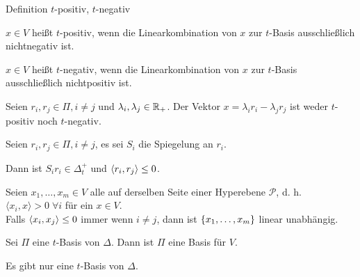 \documentclass{beamer}
\begin{document}
\begin{frame}{Definition \(t\)-positiv, \( t \)-negativ}
    \begin{defi}
        \( x \in V \) heißt \(t\)-positiv, wenn 
        die Linearkombination von \(x\) zur 
        \(t\)-Basis ausschließlich nichtnegativ ist.

        \( x \in V \) heißt \(t\)-negativ, wenn 
        die Linearkombination von \(x\) zur 
        \(t\)-Basis ausschließlich nichtpositiv ist.
    \end{defi}
    \pause
    \begin{satz} %
        Seien \( r_i, r_j \in \Pi, i \neq j \) und 
        \( \lambda_i, \lambda_j \in \mathbb{R}_+ \). 
        Der Vektor \( x = \lambda_i r_i - \lambda_j r_j \) 
        ist weder \( t \)-positiv noch \( t \)-negativ.
    \end{satz}
\end{frame}

\begin{frame}
    \begin{satz} %
        
        Seien \( r_i, r_j \in \Pi, i \neq j \), es 
        sei \( S_i \) die Spiegelung an \( r_i \). 

        Dann ist \( S_i r_i \in \Delta_t^+ \) und 
        \( \langle r_i, r_j \rangle \leq 0 \).
    \end{satz}\pause

    \begin{satz} %
        Seien \( x_1, \ldots, x_m \in V \) alle auf derselben 
        Seite einer Hyperebene \( \mathscr{P} \), 
        d. h. \( \langle x_i, x \rangle > 0 \;\forall i \) für 
        ein \( x\in V \). \\
        Falls \( \langle x_i, x_j \rangle \leq 0 \) immer wenn 
        \( i \neq j \), dann ist \( \{x_1, \ldots, x_m\} \) 
        linear unabhängig.
    \end{satz}
\end{frame}

\begin{frame}
    \begin{satz} %
        Sei \( \Pi \) eine \(t\)-Basis von \( \Delta \). Dann ist 
        \( \Pi \) eine Basis für \( V \).
    \end{satz}\pause
    \begin{satz} %
        Es gibt nur eine \( t \)-Basis von \( \Delta \).
    \end{satz}
\end{frame}
\end{document}
